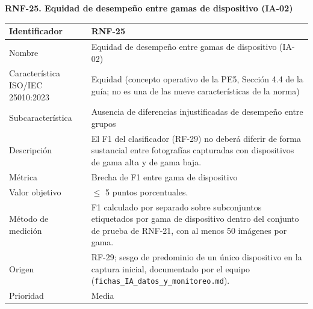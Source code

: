\documentclass[12pt,a4paper]{article}
\begin{document}
\begin{minipage}{\linewidth}
\bigskip
\noindent\textbf{RNF-25. Equidad de desempeño entre gamas de dispositivo (IA-02)}
\label{tab:RNF-25}

\begin{center}
\begin{tabular}{|p{4.2cm}|p{10cm}|}
\hline
Identificador & RNF-25 \\
\hline
Nombre & Equidad de desempeño entre gamas de dispositivo (IA-02) \\
\hline
Característica ISO/IEC 25010:2023 & Equidad (concepto operativo de la PE5, Sección 4.4 de la guía; no es una de las nueve características de la norma) \\
\hline
Subcaracterística & Ausencia de diferencias injustificadas de desempeño entre grupos \\
\hline
Descripción & El F1 del clasificador (RF-29) no deberá diferir de forma sustancial entre fotografías capturadas con dispositivos de gama alta y de gama baja. \\
\hline
Métrica & Brecha de F1 entre gama de dispositivo \\
\hline
Valor objetivo & $\leq$ 5 puntos porcentuales. \\
\hline
Método de medición & F1 calculado por separado sobre subconjuntos etiquetados por gama de dispositivo dentro del conjunto de prueba de RNF-21, con al menos 50 imágenes por gama. \\
\hline
Origen & RF-29; sesgo de predominio de un único dispositivo en la captura inicial, documentado por el equipo (\texttt{fichas\_IA\_datos\_y\_monitoreo.md}). \\
\hline
Prioridad & Media \\
\hline
\end{tabular}
\end{center}
\end{minipage}
\end{document}
